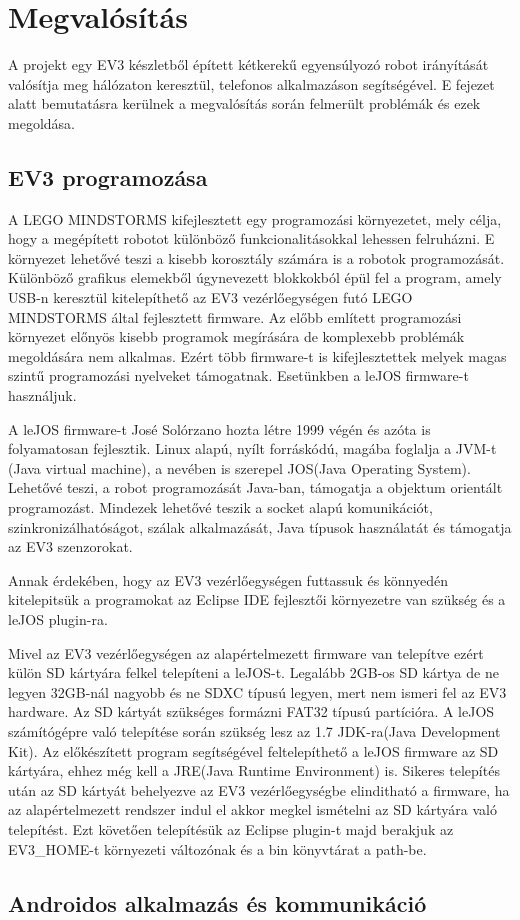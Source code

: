 \chapter{Megvalósítás}\label{ch:MEGVALOSITAS}
\begin{osszefoglal}
	A projekt egy EV3 készletből épített kétkerekű egyensúlyozó robot irányítását valósítja meg hálózaton keresztül, telefonos alkalmazáson segítségével. E fejezet alatt bemutatásra kerülnek a megvalósítás során felmerült problémák és ezek megoldása.
\end{osszefoglal}
\section{EV3 programozása}\label{sec:MEGVALOSITAS:lejos}
A LEGO MINDSTORMS kifejlesztett egy programozási környezetet, mely célja, hogy a megépített robotot különböző funkcionalitásokkal lehessen felruházni. E környezet lehetővé teszi a kisebb korosztály számára is a robotok programozását. Különböző grafikus elemekből úgynevezett blokkokból épül fel a program, amely USB-n keresztül kitelepíthető az EV3 vezérlőegységen futó LEGO MINDSTORMS által fejlesztett firmware.
Az előbb említett programozási környezet előnyös kisebb programok megírására de komplexebb problémák megoldására nem alkalmas. Ezért több firmware-t is kifejlesztettek melyek magas szintű programozási nyelveket támogatnak. Esetünkben a leJOS firmware-t használjuk.

A leJOS firmware-t José Solórzano hozta létre 1999 végén és azóta is folyamatosan fejlesztik. Linux alapú, nyílt forráskódú, magába foglalja a JVM-t (Java virtual machine), a nevében is szerepel JOS(Java Operating System). Lehetővé teszi, a robot programozását Java-ban, támogatja a objektum orientált programozást. Mindezek lehetővé teszik a socket alapú komunikációt, szinkronizálhatóságot, szálak alkalmazását, Java típusok használatát és támogatja az EV3 szenzorokat.

Annak érdekében, hogy az EV3 vezérlőegységen futtassuk és könnyedén kitelepitsük a programokat az Eclipse IDE fejlesztői környezetre van szükség és a leJOS plugin-ra.

Mivel az EV3 vezérlőegységen az alapértelmezett firmware van telepítve ezért külön SD kártyára felkel telepíteni a leJOS-t. Legalább 2GB-os SD kártya de ne legyen 32GB-nál nagyobb és ne SDXC típusú legyen, mert nem ismeri fel az EV3 hardware. Az SD kártyát szükséges formázni FAT32 típusú partícióra. A leJOS számítógépre való telepítése során szükség lesz az 1.7 JDK-ra(Java Development Kit). Az előkészített program segítségével feltelepíthető a leJOS firmware az SD kártyára, ehhez még kell a JRE(Java Runtime Environment) is. Sikeres telepítés után az SD kártyát behelyezve az EV3 vezérlőegységbe elinditható a firmware, ha az alapértelmezett rendszer indul el akkor megkel ismételni az SD kártyára való telepítést. Ezt követően telepítésük az Eclipse plugin-t majd berakjuk az EV3\_HOME-t környezeti változónak és a bin könyvtárat a path-be.

\section{Androidos alkalmazás és kommunikáció}\label{sec:MEGVALOSITAS:android}
